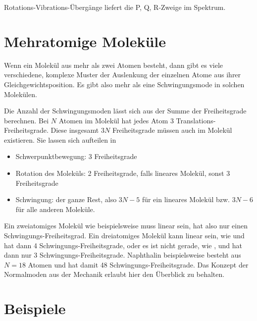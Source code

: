 \begin{marginfigure}
\caption{Rotations-Vibrations-Übergänge liefert die P, Q, R-Zweige im Spektrum.}
\end{marginfigure}
 
 



\section{Mehratomige Moleküle}

Wenn ein Molekül aus mehr als zwei Atomen besteht, dann gibt es viele verschiedene, komplexe Muster der Auslenkung der einzelnen Atome aus ihrer Gleichgewichtsposition. Es gibt also mehr als eine Schwingungsmode in solchen Molekülen.

Die Anzahl der Schwingungsmoden lässt sich aus der Summe der Freiheitsgrade berechnen. Bei $N$ Atomen im Molekül hat jedes Atom $3$ Translations-Freiheitsgrade. Diese insgesamt $3N$ Freiheitsgrade müssen auch im Molekül existieren. Sie lassen sich aufteilen in
\begin{itemize} \setlength{\itemsep}{0pt}
\item Schwerpunktbewegung: 3 Freiheitsgrade
\item Rotation des Moleküls: 2 Freiheitsgrade, falls lineares Molekül, sonst 3 Freiheitsgrade
\item Schwingung: der ganze Rest, also $3N-5$ für ein lineares Molekül bzw. $3N-6$ für alle anderen Moleküle. 
\end{itemize}

Ein zweiatomiges Molekül wie beispielsweise  muss linear sein, hat also nur einen Schwingungs-Freiheitsgrad. Ein dreiatomiges Molekül kann linear sein, wie  und hat dann 4  Schwingungs-Freiheitsgrade, oder es ist nicht gerade, wie , und hat dann nur 3  Schwingungs-Freiheitsgrade. Naphthalin beispielsweise besteht aus $N=18$ Atomen und hat damit  48 Schwingungs-Freiheitsgrade. Das Konzept der Normalmoden aus der Mechanik erlaubt hier den Überblick zu behalten.

\section{Beispiele}

